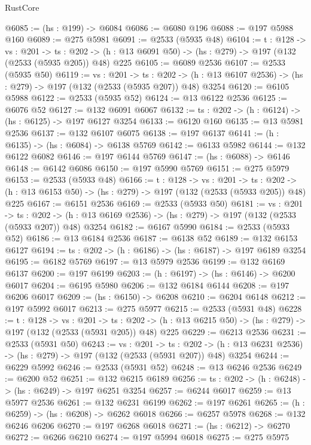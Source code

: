 \begin{lexlean}{RustCore}
\begin{coremodule}
@6085 := (hs : @199) -> @6084
@6086 := @6080 @196
@6088 := @197 @5988 @160
@6089 := @275 @5981
@6091 := @2533 (@5935 @48)
@6104 := {t : @128} ->
  {vs : @201} ->
  {ts : @202} -> (h : @13 @6091 @50) -> (hs : @279) -> @197 (@132 (@2533 (@5935 @205)) @48) @225
@6105 := @6089 @2536
@6107 := @2533 (@5935 @50)
@6119 := {vs : @201} ->
  {ts : @202} -> (h : @13 @6107 @2536) -> (hs : @279) -> @197 (@132 (@2533 (@5935 @207)) @48) @3254
@6120 := @6105 @5988
@6122 := @2533 (@5935 @52)
@6124 := @13 @6122 @2536
@6125 := @6076 @52
@6127 := @132 @6091 @6067
@6132 := {ts : @202} -> (h : @6124) -> (hs : @6125) -> @197 @6127 @3254
@6133 := @6120 @160
@6135 := @13 @5981 @2536
@6137 := @132 @6107 @6075
@6138 := @197 @6137
@6141 := (h : @6135) -> (hs : @6084) -> @6138 @5769
@6142 := @6133 @5982
@6144 := @132 @6122 @6082
@6146 := @197 @6144 @5769
@6147 := (hs : @6088) -> @6146
@6148 := @6142 @6086
@6150 := @197 @5990 @5769
@6151 := @275 @5979
@6153 := @2533 (@5933 @48)
@6166 := {t : @128} ->
  {vs : @201} ->
  {ts : @202} -> (h : @13 @6153 @50) -> (hs : @279) -> @197 (@132 (@2533 (@5933 @205)) @48) @225
@6167 := @6151 @2536
@6169 := @2533 (@5933 @50)
@6181 := {vs : @201} ->
  {ts : @202} -> (h : @13 @6169 @2536) -> (hs : @279) -> @197 (@132 (@2533 (@5933 @207)) @48) @3254
@6182 := @6167 @5990
@6184 := @2533 (@5933 @52)
@6186 := @13 @6184 @2536
@6187 := @6138 @52
@6189 := @132 @6153 @6127
@6194 := {ts : @202} -> (h : @6186) -> (hs : @6187) -> @197 @6189 @3254
@6195 := @6182 @5769
@6197 := @13 @5979 @2536
@6199 := @132 @6169 @6137
@6200 := @197 @6199
@6203 := (h : @6197) -> (hs : @6146) -> @6200 @6017
@6204 := @6195 @5980
@6206 := @132 @6184 @6144
@6208 := @197 @6206 @6017
@6209 := (hs : @6150) -> @6208
@6210 := @6204 @6148
@6212 := @197 @5992 @6017
@6213 := @275 @5977
@6215 := @2533 (@5931 @48)
@6228 := {t : @128} ->
  {vs : @201} ->
  {ts : @202} -> (h : @13 @6215 @50) -> (hs : @279) -> @197 (@132 (@2533 (@5931 @205)) @48) @225
@6229 := @6213 @2536
@6231 := @2533 (@5931 @50)
@6243 := {vs : @201} ->
  {ts : @202} -> (h : @13 @6231 @2536) -> (hs : @279) -> @197 (@132 (@2533 (@5931 @207)) @48) @3254
@6244 := @6229 @5992
@6246 := @2533 (@5931 @52)
@6248 := @13 @6246 @2536
@6249 := @6200 @52
@6251 := @132 @6215 @6189
@6256 := {ts : @202} -> (h : @6248) -> (hs : @6249) -> @197 @6251 @3254
@6257 := @6244 @6017
@6259 := @13 @5977 @2536
@6261 := @132 @6231 @6199
@6262 := @197 @6261
@6265 := (h : @6259) -> (hs : @6208) -> @6262 @6018
@6266 := @6257 @5978
@6268 := @132 @6246 @6206
@6270 := @197 @6268 @6018
@6271 := (hs : @6212) -> @6270
@6272 := @6266 @6210
@6274 := @197 @5994 @6018
@6275 := @275 @5975

\end{coremodule}
\end{lexlean}
